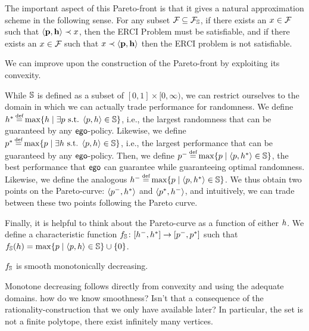 The important aspect of this Pareto-front is that it gives a natural approximation scheme in the following sense.
For any subset $\mathcal{F}_{} \subseteq \mathcal{F}_{\mathbb{S}}$, if there exists an  $x \in \mathcal{F}_{}$ such that $\langle \mathbf{p}, \mathbf{h} \rangle \prec x$, then the ERCI Problem must be satisfiable, 
and if there exists an $x \in \mathcal{F}_{}$ such that $x \prec \langle \mathbf{p}, \mathbf{h} \rangle$ then the ERCI problem is not satisfiable. 

\begin{example}
	
\end{example}

We can improve upon the construction of the Pareto-front by exploiting its convexity.

While $\mathbb{S}$ is defined as a subset of $[0,1] \times [0,\infty)$, we can restrict ourselves to the domain in which we can actually trade performance for randomness. 
We define 
$\rndopt \eqdef \max \{ \rndp \mid \exists \scp \text{ s.t. } \langle \scp, \rndp \rangle \in \solutions  \} $, i.e., the largest randomness that can be guaranteed by any $\mathsf{ego}$-policy. 
Likewise, we define 
$\scopt \eqdef \max \{ \scp \mid \exists \rndp \text{ s.t. } \langle \scp, \rndp \rangle \in \solutions  \} $, i.e., the largest performance that can be guaranteed by any $\mathsf{ego}$-policy. 
Then, we define 
$\scmin \eqdef \max \{ \scp \mid \langle \scp, \rndopt \rangle  \in \solutions \}$, the best performance that $\mathsf{ego}$ can guarantee while guaranteeing optimal randomness. 
Likewise, we define  the analogous $\rndmin \eqdef \max \{ \scp \mid \langle \scp, \rndopt \rangle  \in \solutions \}$.
We thus obtain two points on the Pareto-curve: $\langle p^{-}, h^{*} \rangle$ and $\langle p^{*}, h^{-} \rangle$, and intuitively, we can trade between these two points following the Pareto curve.


Finally, it is helpful to think about the Pareto-curve as a function of either $h$. 
We define a characteristic function $f_\mathbb{S}\colon [h^{-},h^{*}] \rightarrow [p^{-},p^{*}]$ such that $f_\mathbb{S}(h) = \max \{ p \mid \langle p, h \rangle \in \mathbb{S} \} \cup \{ 0 \}$.  
\begin{proposition}
	$f_\mathbb{S}$ is smooth monotonically decreasing. 
\end{proposition}
Monotone decreasing follows directly from convexity and using the adequate domains. 
{\color{red}how do we know smoothness? Isn't that a consequence of the rationality-construction that we only have available later?}
In particular, the set is not a finite polytope, there exist infinitely many vertices.


